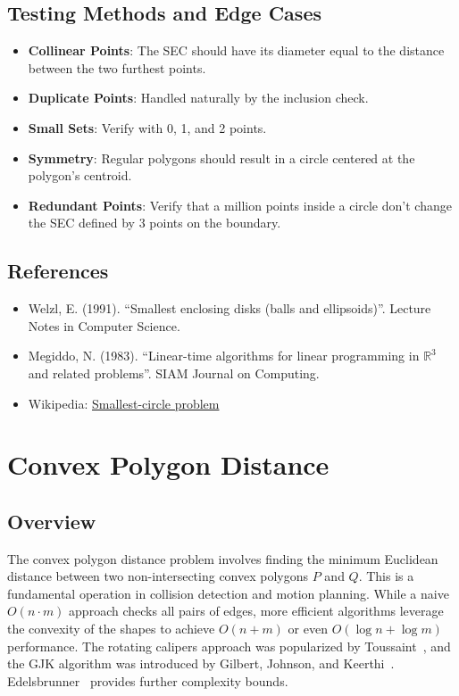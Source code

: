 \subsection{Testing Methods and Edge Cases}
\begin{itemize}
    \item \textbf{Collinear Points}: The SEC should have its diameter equal to the distance between the two furthest points.
    \item \textbf{Duplicate Points}: Handled naturally by the inclusion check.
    \item \textbf{Small Sets}: Verify with 0, 1, and 2 points.
    \item \textbf{Symmetry}: Regular polygons should result in a circle centered at the polygon's centroid.
    \item \textbf{Redundant Points}: Verify that a million points inside a circle don't change the SEC defined by 3 points on the boundary.
\end{itemize}

\subsection{References}
\begin{itemize}
    \item Welzl, E. (1991). ``Smallest enclosing disks (balls and ellipsoids)''. Lecture Notes in Computer Science.
    \item Megiddo, N. (1983). ``Linear-time algorithms for linear programming in $\mathbb{R}^3$ and related problems''. SIAM Journal on Computing.
    \item Wikipedia: \href{https://en.wikipedia.org/wiki/Smallest-circle_problem}{Smallest-circle problem}
\end{itemize}

\section{Convex Polygon Distance}
\label{sec:convex_polygon_distance}

\subsection{Overview}
The convex polygon distance problem involves finding the minimum Euclidean distance between two non-intersecting convex polygons $P$ and $Q$. This is a fundamental operation in collision detection and motion planning. While a naive $O(n \cdot m)$ approach checks all pairs of edges, more efficient algorithms leverage the convexity of the shapes to achieve $O(n + m)$ or even $O(\log n + \log m)$ performance. The rotating calipers approach was popularized by Toussaint~\cite{toussaint1983}, and the GJK algorithm was introduced by Gilbert, Johnson, and Keerthi~\cite{gilbert1988}. Edelsbrunner~\cite{edelsbrunner1985} provides further complexity bounds.

